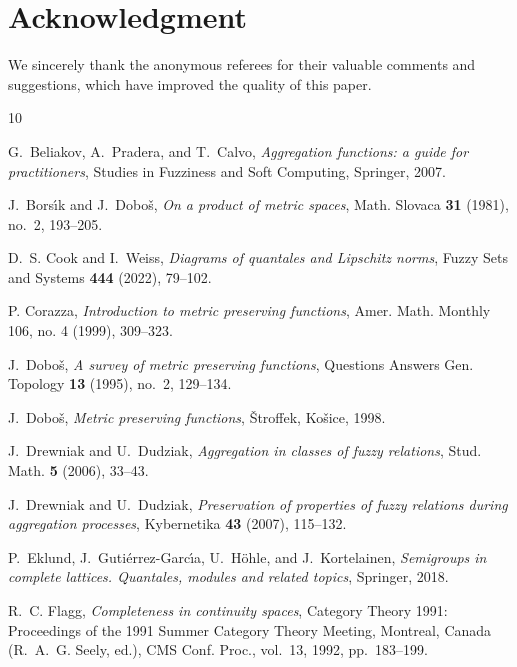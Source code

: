 \documentclass[11pt,a4paper]{amsart}
\theoremstyle{definition}
\begin{document}
\section*{Acknowledgment}

We sincerely thank the anonymous referees for their valuable comments and suggestions, which have improved the quality of this paper.



	
	\begin{thebibliography}{10}
		
		G.~Beliakov, A.~Pradera, and T.~Calvo, \emph{Aggregation functions: a guide for
			practitioners}, Studies in Fuzziness and Soft Computing, Springer, 2007.
		
		J.~Bors\'{\i}k and J.~Dobo\v{s}, \emph{On a product of metric spaces}, Math.
		Slovaca \textbf{31} (1981), no.~2, 193--205.
		
		D.~S. Cook and I.~Weiss, \emph{Diagrams of quantales and {L}ipschitz norms},
		Fuzzy Sets and Systems \textbf{444} (2022), 79--102.
		
		
		P. Corazza, \emph{Introduction to metric preserving functions}, Amer. Math. Monthly 106, no. 4 (1999), 309--323.
		
		J.~Dobo\v{s}, \emph{A survey of metric preserving functions}, Questions Answers
		Gen. Topology \textbf{13} (1995), no.~2, 129--134.
		
		J.~Dobo\v{s}, \emph{Metric preserving functions}, \v Stroffek, Ko\v sice, 1998.
		
		J.~Drewniak and U.~Dudziak, \emph{Aggregation in classes of fuzzy relations},
		Stud. Math. \textbf{5} (2006), 33--43.
		
		J.~Drewniak and U.~Dudziak, \emph{Preservation of properties of fuzzy relations during aggregation
			processes}, Kybernetika \textbf{43} (2007), 115--132.
		
		P.~Eklund, J.~Guti\'errez-Garc\'{\i}a, U.~H\"ohle, and J.~Kortelainen,
		\emph{Semigroups in complete lattices. {Q}uantales, modules and related
			topics}, Springer, 2018.
		
		R.~C. Flagg, \emph{Completeness in continuity spaces}, Category Theory 1991:
		Proceedings of the 1991 Summer Category Theory Meeting, Montreal, Canada
		(R.~A.~G. Seely, ed.), CMS Conf. Proc., vol.~13, 1992, pp.~183--199.
		

\end{thebibliography}
\end{document}
